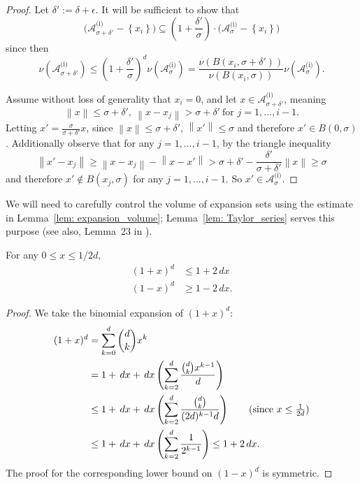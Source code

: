 \documentclass[11pt,twoside]{article}
\newcommand{\set}[1]{\left\{#1\right\}}
\newcommand{\norm}[1]{\left\lVert#1\right\rVert}
\newcommand{\1}{\mathbbm{1}}
\newcommand{\Aset}{\mathcal{A}}
\newcommand{\Asig}{\Aset_{\sigma}}
\newcommand{\dx}{\,dx}
\begin{document}
\begin{proof}
	Let $\delta' := \delta + \epsilon$. It will be sufficient to show that
	\begin{equation*}
	\biggl(\Aset_{\sigma + \delta'}^{\text{(i)}} - \set{x_i}\biggr) \subseteq \left(1 + \frac{\delta'}{\sigma}\right)\cdot\biggl(\Asig^{\text{(i)}} - \set{x_i}\biggr) 
	\end{equation*}
	since then
	\begin{equation*}
	\nu(\Aset_{\sigma + \delta'}^{\text{(i)}}) \leq \left(1 + \frac{\delta'}{\sigma}\right)^d \nu(\Aset_{\sigma}^{\text{(i)}}) = \frac{\nu(B(x_i, \sigma + \delta'))}{\nu(B(x_i, \sigma))} \nu(\Aset_{\sigma}^{\text{(i)}}).
	\end{equation*}
	
	Assume without loss of generality that $x_i = 0$, and let $x \in \Aset_{\sigma + \delta'}^{\text{(i)}}$, meaning
	\begin{equation}
	\norm{x} \leq \sigma + \delta',~ \norm{x - x_j} > \sigma + \delta'~ \textrm{for $j = 1, \ldots, i - 1$}.
	\end{equation}
	Letting $x' = \frac{\sigma}{\sigma + \delta'} x$, since $\norm{x} \leq \sigma + \delta'$, $\norm{x'} \leq \sigma$ and therefore $x' \in B(0,\sigma)$. Additionally observe that for any $j = 1, \ldots, i - 1$, by the triangle inequality
	\begin{equation*}
	\norm{x' - x_j} \geq \norm{x - x_j} - \norm{x - x'} > \sigma + \delta' - \frac{\delta'}{\sigma + \delta'}\norm{x} \geq \sigma
	\end{equation*}
	and therefore $x' \not\in B(x_j,\sigma)$ for any $j = 1,\ldots, i - 1$. So $x' \in \Asig^{\text{(i)}}$.
\end{proof}

We will need to carefully control the volume of expansion sets using the estimate in Lemma~\ref{lem: expansion_volume}; Lemma~\ref{lem: Taylor_series} serves this purpose (see also, Lemma~23 in \cite{balakrishnan2013}). 
\begin{lemma}
	\label{lem: Taylor_series}
	For any $0 \leq x \leq 1/2d$,
	\begin{align*}
	(1 + x)^d & \leq 1 + 2\dx \\
	(1 - x)^d & \geq 1 - 2\dx.
	\end{align*}
\end{lemma}
\begin{proof}
	We take the binomial expansion of $(1 + x)^d$:
	\begin{align*}
	(1 + x)^d & = \sum_{k = 0}^{d} {d \choose k} x^k \\
	& = 1 + \dx + \dx\left(\sum_{k = 2}^d \frac{{d \choose k} x^{k - 1}}{d}\right)\\
	& \leq 1 + \dx + \dx\left(\sum_{k = 2}^d \frac{{d \choose k}}{(2d)^{k-1}d}\right) \tag{since $x \leq \frac{1}{2d}$} \\
	& \leq 1 + \dx + \dx\left(\sum_{k = 2}^d \frac{1}{2^{k - 1}}\right) \leq 1 + 2\dx.
	\end{align*}
The proof for the corresponding lower bound on $(1 - x)^d$ is symmetric.
\end{proof}
\end{document}
